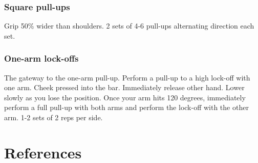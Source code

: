 \documentclass[12pt, letterpaper]{article}
\begin{document}
\subsubsection{Square pull-ups}

Grip 50\% wider than shoulders. 2 sets of 4-6 pull-ups alternating direction each set.

\subsubsection{One-arm lock-offs}

The gateway to the one-arm pull-up. Perform a pull-up to a high lock-off with one arm. Cheek pressed into the bar. 
Immediately release other hand. Lower slowly as you lose the position. Once your arm hits 120 degrees, immediately
 perform a full pull-up with both arms and perform the lock-off with the other arm. 
  1-2 sets of 2 reps per side.

\newpage %







\section{References}
\printbibliography[heading=none] 
\end{document}

